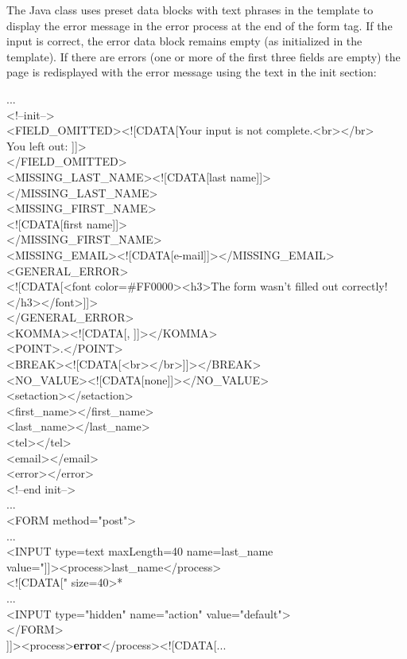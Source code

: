 The Java class uses preset data blocks with text phrases in the template
to display the error message in the error process at the end of the form
tag. If the input is correct, the error data block remains empty (as
initialized in the template). If there are errors (one or more of the
first three fields are empty) the page is redisplayed with the error
message using the text in the {\name init} section:
\begin{java}
...\\
<!--init-->\\
<FIELD\_OMITTED><![CDATA[Your input is not complete.<br></br>\\
You left out: ]]>\\
</FIELD\_OMITTED>\\
<MISSING\_LAST\_NAME><![CDATA[last name]]></MISSING\_LAST\_NAME>\\
<MISSING\_FIRST\_NAME>\\
<![CDATA[first name]]>\\
</MISSING\_FIRST\_NAME>\\
<MISSING\_EMAIL><![CDATA[e-mail]]></MISSING\_EMAIL>\\
<GENERAL\_ERROR>\\
<![CDATA[<font color=\#FF0000><h3>The form wasn't filled out correctly!\\
</h3></font>]]>\\
</GENERAL\_ERROR>\\

<KOMMA><![CDATA[, ]]></KOMMA>\\
<POINT>.</POINT>\\
<BREAK><![CDATA[<br></br>]]></BREAK>\\
<NO\_VALUE><![CDATA[none]]></NO\_VALUE>\\

<setaction></setaction>\\
<first\_name></first\_name>\\
<last\_name></last\_name>\\
<tel></tel>\\
<email></email>\\
<error></error>\\
<!--end init-->\\
...\\
<FORM method="post">\\
...\\
<INPUT type=text maxLength=40 name=last\_name\\
value="]]><process>last\_name</process>\\
<![CDATA[" size=40>*\\
...\\
<INPUT type="hidden" name="action" value="default">\\
</FORM>\\
]]><process>{\bf error}</process><![CDATA[...\\
\end{java}


